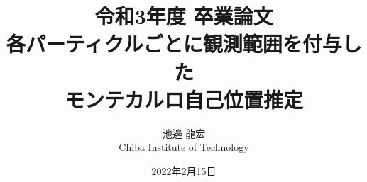 \documentclass[a4paper,11pt]{jsbook}
\begin{document}
\title{令和3年度 卒業論文\\
各パーティクルごとに観測範囲を付与した\\モンテカルロ自己位置推定}

\author{池邉 龍宏 \\
Chiba Institute of Technology}

\date{2022年2月15日}

\maketitle



\tableofcontents



\cleardoublepage
{}
 











\newpage
\printindex
\end{document}
